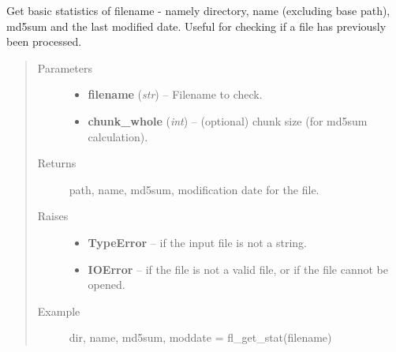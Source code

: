 \documentclass[letterpaper,10pt,english]{sphinxmanual}
\begin{document}

\begin{fulllineitems}
\label{docs/utilities:utilities.files.fl_get_stat}
Get basic statistics of filename - namely directory, name (excluding
base path), md5sum and the last modified date. Useful for checking
if a file has previously been processed.
\begin{quote}\begin{description}
\item[{Parameters}] \leavevmode\begin{itemize}
\item {} 
\textbf{filename} (\emph{str}) -- Filename to check.

\item {} 
\textbf{chunk\_whole} (\emph{int}) -- (optional) chunk size (for md5sum calculation).

\end{itemize}

\item[{Returns}] \leavevmode
path, name, md5sum, modification date for the file.

\item[{Raises}] \leavevmode\begin{itemize}
\item {} 
\textbf{TypeError} -- if the input file is not a string.

\item {} 
\textbf{IOError} -- if the file is not a valid file, or if the file
cannot be opened.

\end{itemize}

\item[{Example }] \leavevmode
dir, name, md5sum, moddate = fl\_get\_stat(filename)

\end{description}\end{quote}

\end{fulllineitems}


\end{document}
